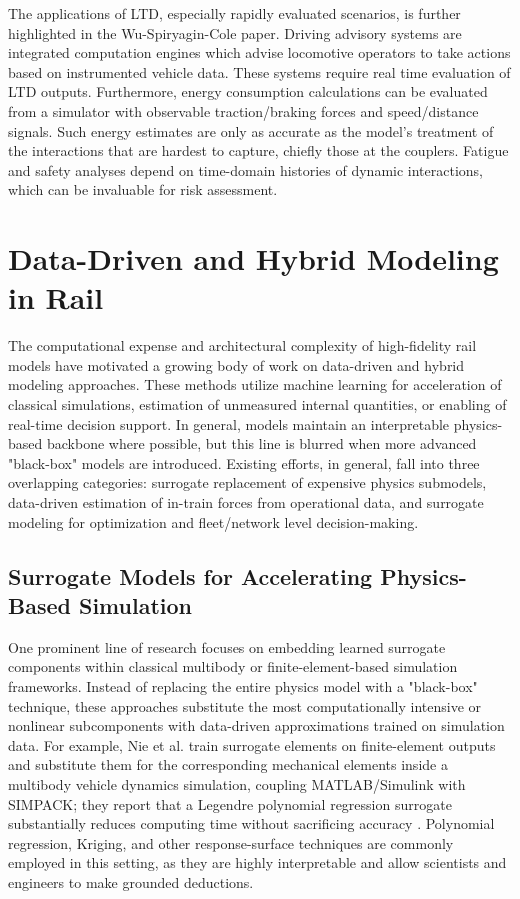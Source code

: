 The applications of LTD, especially rapidly evaluated scenarios, is further highlighted in the Wu-Spiryagin-Cole paper. Driving advisory systems are integrated computation engines which advise locomotive operators to take actions based on instrumented vehicle data. These systems require real time evaluation of LTD outputs. Furthermore, energy consumption calculations can be evaluated from a simulator with observable traction/braking forces and speed/distance signals. Such energy estimates are only as accurate as the model's treatment of the interactions that are hardest to capture, chiefly those at the couplers. Fatigue and safety analyses depend on time-domain histories of dynamic interactions, which can be invaluable for risk assessment. 


\vfill

\section{Data-Driven and Hybrid Modeling in Rail}

The computational expense and architectural complexity of high-fidelity rail models have motivated a growing body of work on data-driven and hybrid modeling approaches. These methods utilize machine learning for acceleration of classical simulations, estimation of unmeasured internal quantities, or enabling of real-time decision support. In general, models maintain an interpretable physics-based backbone where possible, but this line is blurred when more advanced "black-box" models are introduced. Existing efforts, in general, fall into three overlapping categories: surrogate replacement of expensive physics submodels, data-driven estimation of in-train forces from operational data, and surrogate modeling for optimization and fleet/network level decision-making.

\subsection{Surrogate Models for Accelerating Physics-Based Simulation}

One prominent line of research focuses on embedding learned surrogate components within classical multibody or finite-element-based simulation frameworks. Instead of replacing the entire physics model with a "black-box" technique, these approaches substitute the most computationally intensive or nonlinear subcomponents with data-driven approximations trained on simulation data. For example, Nie et al. train surrogate elements on finite-element outputs and substitute them for the corresponding mechanical elements inside a multibody vehicle dynamics simulation, coupling MATLAB/Simulink with SIMPACK; they report that a Legendre polynomial regression surrogate substantially reduces computing time without sacrificing accuracy \cite{nie_data_driven_dynamics}. Polynomial regression, Kriging, and other response-surface techniques are commonly employed in this setting, as they are highly interpretable and allow scientists and engineers to make grounded deductions.

